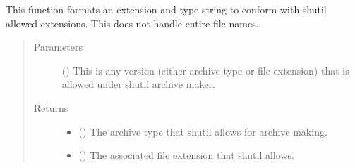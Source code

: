 \documentclass[letterpaper,10pt,english]{sphinxmanual}
\begin{document}
\begin{fulllineitems}
\label{\detokenize{docstrings/ifa_smeargle.core.string_formatting:ifa_smeargle.core.string_formatting.format_shutil_archive_extensions}}
This function formats an extension and type string to
conform with shutil allowed extensions. This does not handle
entire file names.
\begin{quote}\begin{description}
\item[{Parameters}] \leavevmode
{} () \textendash{} This is any version (either archive type or file extension)
that is allowed under shutil archive maker.

\item[{Returns}] \leavevmode
\begin{itemize}
\item {} 
 () \textendash{} The archive type that shutil allows for archive making.

\item {} 
 () \textendash{} The associated file extension that shutil allows.

\end{itemize}


\end{description}\end{quote}

\end{fulllineitems}

\end{document}
